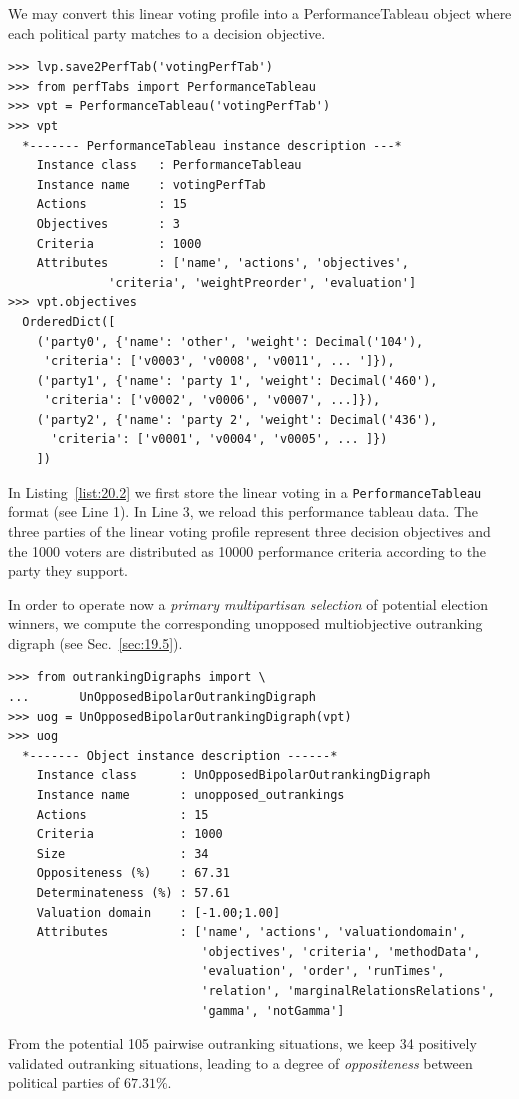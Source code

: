 We may convert this linear voting profile into a PerformanceTableau object where each political party matches to a decision objective.
\begin{lstlisting}[caption={Converting a voting profile into a performance tableau},label=list:20.2]
>>> lvp.save2PerfTab('votingPerfTab')
>>> from perfTabs import PerformanceTableau
>>> vpt = PerformanceTableau('votingPerfTab')
>>> vpt
  *------- PerformanceTableau instance description ---*
    Instance class   : PerformanceTableau
    Instance name    : votingPerfTab
    Actions          : 15
    Objectives       : 3
    Criteria         : 1000
    Attributes       : ['name', 'actions', 'objectives',
              'criteria', 'weightPreorder', 'evaluation']
>>> vpt.objectives
  OrderedDict([
    ('party0', {'name': 'other', 'weight': Decimal('104'),
     'criteria': ['v0003', 'v0008', 'v0011', ... ']}),
    ('party1', {'name': 'party 1', 'weight': Decimal('460'),
     'criteria': ['v0002', 'v0006', 'v0007', ...]}),
    ('party2', {'name': 'party 2', 'weight': Decimal('436'),
      'criteria': ['v0001', 'v0004', 'v0005', ... ]})
    ])
\end{lstlisting}
In Listing~\vref{list:20.2} we first store the linear voting in a \texttt{PerformanceTableau} format (see Line 1). In Line 3, we reload this performance tableau data. The three parties of the linear voting profile represent three decision objectives and the 1000 voters are distributed as 10000 performance criteria according to the party they support.


In order to operate now a \emph{primary multipartisan selection} of potential election winners, we compute the corresponding unopposed multiobjective outranking digraph (see Sec.~\ref{sec:19.5}).
\begin{lstlisting}[caption={Computing unopposed multiobjective outranking situations},label=list:20.3]
>>> from outrankingDigraphs import \
...       UnOpposedBipolarOutrankingDigraph
>>> uog = UnOpposedBipolarOutrankingDigraph(vpt)
>>> uog
  *------- Object instance description ------*
    Instance class      : UnOpposedBipolarOutrankingDigraph
    Instance name       : unopposed_outrankings
    Actions             : 15
    Criteria            : 1000
    Size                : 34
    Oppositeness (%)    : 67.31
    Determinateness (%) : 57.61
    Valuation domain    : [-1.00;1.00]
    Attributes          : ['name', 'actions', 'valuationdomain',
                           'objectives', 'criteria', 'methodData',
                           'evaluation', 'order', 'runTimes',
                           'relation', 'marginalRelationsRelations',
                           'gamma', 'notGamma']
\end{lstlisting}
From the potential 105 pairwise outranking situations, we keep 34 positively validated outranking situations, leading to a degree of \emph{oppositeness} between political parties of $67.31\%$.

